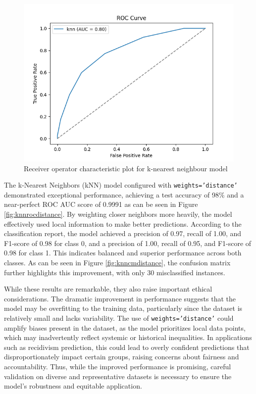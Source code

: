 	\begin{figure}[H]
		\centering
		\includegraphics[width=0.7\linewidth]{img/knn_roc}
		\caption{Receiver operator characteristic plot for k-nearest neighbour model}
		\label{fig:knnroc}
	\end{figure}
	
	
	
	The k-Nearest Neighbors (kNN) model configured with \texttt{weights='distance'} demonstrated exceptional performance, achieving a test accuracy of 98\% and a near-perfect ROC AUC score of 0.9991 as can be seen in Figure \ref{fig:knnrocdistance}. By weighting closer neighbors more heavily, the model effectively used local information to make better predictions. According to the classification report, the model achieved a precision of 0.97, recall of 1.00, and F1-score of 0.98 for class 0, and a precision of 1.00, recall of 0.95, and F1-score of 0.98 for class 1. This indicates balanced and superior performance across both classes. As can be seen in Figure \ref{fig:knncmdistance}, the confusion matrix further highlights this improvement, with only 30 misclassified instances.
	
	While these results are remarkable, they also raise important ethical considerations. The dramatic improvement in performance suggests that the model may be overfitting to the training data, particularly since the dataset is relatively small and lacks variability. The use of \texttt{weights='distance'} could amplify biases present in the dataset, as the model prioritizes local data points, which may inadvertently reflect systemic or historical inequalities. In applications such as recidivism prediction, this could lead to overly confident predictions that disproportionately impact certain groups, raising concerns about fairness and accountability. Thus, while the improved performance is promising, careful validation on diverse and representative datasets is necessary to ensure the model's robustness and equitable application.
	
